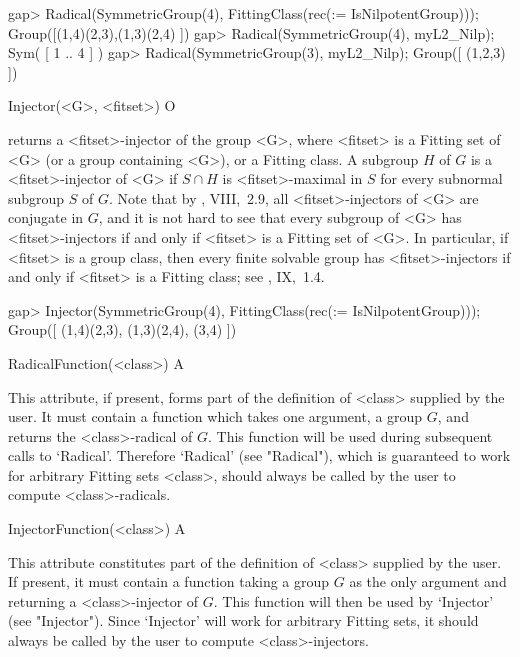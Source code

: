 \beginexample
gap> Radical(SymmetricGroup(4), FittingClass(rec(\in := IsNilpotentGroup)));
Group([(1,4)(2,3),(1,3)(2,4) ])
gap> Radical(SymmetricGroup(4), myL2_Nilp);
Sym( [ 1 .. 4 ] ) 
gap> Radical(SymmetricGroup(3), myL2_Nilp);
Group([ (1,2,3) ])
\endexample

\>Injector(<G>, <fitset>) O

returns a <fitset>-injector of the group <G>, where <fitset> is a
Fitting set of <G> (or a group containing <G>), or a Fitting class. A
subgroup $H$ of $G$ is a <fitset>-injector of <G> if $S \cap H$ is
<fitset>-maximal in $S$ for every subnormal subgroup $S$ of $G$. Note that by 
\cite{DH92}, VIII,~2.9, all <fitset>-injectors of <G> are conjugate in $G$,
and it is not hard to see that every subgroup of <G> has <fitset>-injectors
if and only if <fitset> is a Fitting set of <G>. In particular, if <fitset>
is a group class, then every finite
solvable group has <fitset>-injectors if and only if <fitset> is a Fitting
class; see \cite{DH92}, IX,~1.4.

\beginexample
gap> Injector(SymmetricGroup(4), FittingClass(rec(\in := IsNilpotentGroup)));
Group([ (1,4)(2,3), (1,3)(2,4), (3,4) ])
\endexample

\>RadicalFunction(<class>) A

This attribute, if present, forms part of the definition of <class> supplied
by the user. It must contain a function which takes one argument, a group
$G$, and returns the <class>-radical of $G$. This function
will be used during subsequent calls to `Radical'. Therefore
`Radical' (see "Radical"), which is guaranteed to work for
arbitrary  Fitting sets <class>, should always be called by the user to
compute <class>-radicals.

\>InjectorFunction(<class>) A

This attribute constitutes part of the definition of <class> supplied by the
user. If present, it must contain a function taking a group
$G$ as the only argument and returning a <class>-injector of $G$. This
function will then be used by `Injector' (see "Injector"). Since `Injector'
will work for arbitrary  Fitting sets, it should always be called by the user
to compute <class>-injectors.


\null



